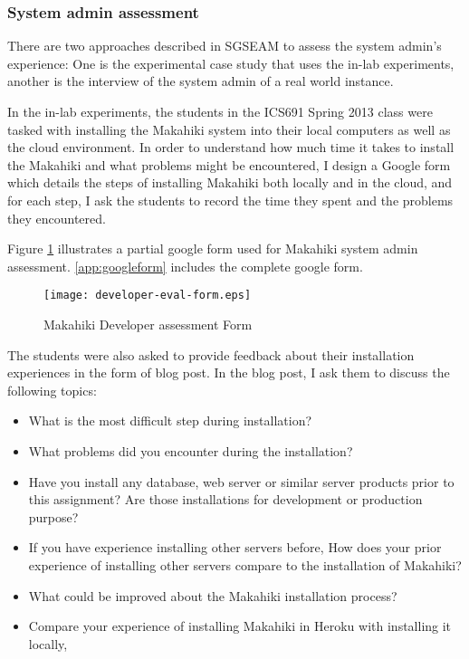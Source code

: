 \subsubsection{System admin assessment}

There are two approaches described in SGSEAM to assess the system admin's experience: One is the experimental case study that uses the in-lab experiments, another is the interview of the system admin of a real world instance.

In the in-lab experiments, the students in the ICS691 Spring 2013 class were tasked with installing the Makahiki system into their local computers as well as the cloud environment. In order to understand how much time it takes to install the Makahiki and what problems might be encountered, I design a Google form which details the steps of installing Makahiki both locally and in the cloud, and for each step, I ask the students to record the time they spent and the problems they encountered.

Figure \ref{fig:developer-eval-form} illustrates a partial google form used for Makahiki system admin assessment. \autoref{app:googleform} includes the complete google form.
\begin{figure}[ht!]
   \centering
   \texttt{[image: developer-eval-form.eps]}
   \caption{Makahiki Developer assessment Form}
   \label{fig:developer-eval-form}
\end{figure}

The students were also asked to provide feedback about their installation experiences in the form of blog post. In the blog post, I ask them to discuss the following topics:
\begin{itemize}
\item What is the most difficult step during installation?
\item What problems did you encounter during the installation?
\item Have you install any database, web server or similar server products prior to this assignment? Are those installations for development or production purpose?
\item If you have experience installing other servers before, How does your prior experience of installing other servers compare to the installation of Makahiki?
\item What could be improved about the Makahiki installation process?
\item Compare your experience of installing Makahiki in Heroku with installing it locally,
\end{itemize}

